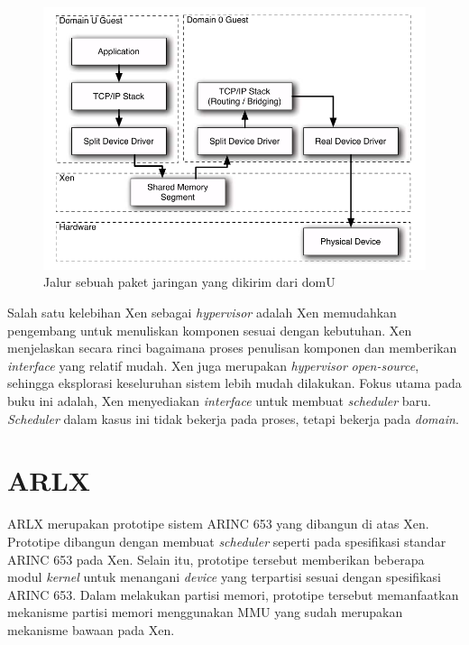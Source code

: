 \begin{figure}[!ht]
    \includegraphics[scale=0.5]{./resources/xen-split-driver.png}
    \caption[Jalur sebuah paket jaringan yang dikirim dari domU]{Jalur sebuah paket jaringan yang dikirim dari domU \citep{Chisnall2014}}
    \label{figure:xen_split_driver}
\end{figure}

Salah satu kelebihan Xen sebagai \textit{hypervisor} adalah Xen memudahkan pengembang untuk
menuliskan komponen sesuai dengan kebutuhan.  Xen menjelaskan secara rinci bagaimana proses
penulisan komponen dan memberikan \textit{interface} yang relatif mudah.  Xen juga merupakan
\textit{hypervisor} \textit{open-source}, sehingga eksplorasi keseluruhan sistem lebih mudah
dilakukan.  Fokus utama pada buku ini adalah, Xen menyediakan \textit{interface} untuk membuat
\textit{scheduler} baru.  \textit{Scheduler} dalam kasus ini tidak bekerja pada proses,
tetapi bekerja pada \textit{domain}.

\section{ARLX}

ARLX merupakan prototipe sistem ARINC 653 yang dibangun di atas Xen.  Prototipe dibangun dengan
membuat \textit{scheduler} seperti pada spesifikasi standar ARINC 653 pada Xen.  Selain itu,
prototipe tersebut memberikan beberapa modul \textit{kernel} untuk menangani \textit{device}
yang terpartisi sesuai dengan spesifikasi ARINC 653. Dalam melakukan partisi memori, prototipe
tersebut memanfaatkan mekanisme partisi memori menggunakan MMU yang sudah merupakan mekanisme
bawaan pada Xen.

